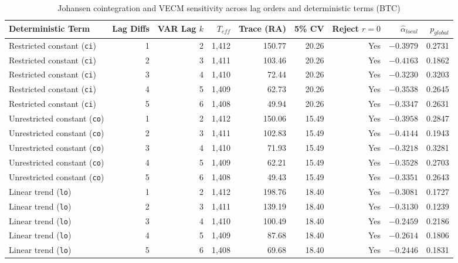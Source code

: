 \begin{table}[htbp]
\centering
\caption{Johansen cointegration and VECM sensitivity across lag orders and deterministic terms (BTC)}
\label{tab:lag_sens}
\fontsize{6.5}{8}\selectfont\setlength{\tabcolsep}{2pt}
\begingroup
\begin{tabular}{@{}>{\raggedright\arraybackslash}p{2.7cm}rrrrrrrr@{}}
\toprule
Deterministic Term & Lag Diffs & VAR Lag $k$ & $T_{eff}$ & Trace (RA) & 5\% CV & Reject $r=0$ & $\hat{\alpha}_{local}$ & $p_{global}$ \\
\midrule
Restricted constant (\texttt{ci}) & 1 & 2 & 1,412 & 150.77 & 20.26 & Yes & $-0.3979$ & 0.2731 \\
Restricted constant (\texttt{ci}) & 2 & 3 & 1,411 & 103.46 & 20.26 & Yes & $-0.4163$ & 0.1862 \\
Restricted constant (\texttt{ci}) & 3 & 4 & 1,410 & 72.44 & 20.26 & Yes & $-0.3230$ & 0.3203 \\
Restricted constant (\texttt{ci}) & 4 & 5 & 1,409 & 62.73 & 20.26 & Yes & $-0.3538$ & 0.2645 \\
Restricted constant (\texttt{ci}) & 5 & 6 & 1,408 & 49.94 & 20.26 & Yes & $-0.3347$ & 0.2631 \\
Unrestricted constant (\texttt{co}) & 1 & 2 & 1,412 & 150.06 & 15.49 & Yes & $-0.3958$ & 0.2847 \\
Unrestricted constant (\texttt{co}) & 2 & 3 & 1,411 & 102.83 & 15.49 & Yes & $-0.4144$ & 0.1943 \\
Unrestricted constant (\texttt{co}) & 3 & 4 & 1,410 & 71.93 & 15.49 & Yes & $-0.3218$ & 0.3281 \\
Unrestricted constant (\texttt{co}) & 4 & 5 & 1,409 & 62.21 & 15.49 & Yes & $-0.3528$ & 0.2703 \\
Unrestricted constant (\texttt{co}) & 5 & 6 & 1,408 & 49.43 & 15.49 & Yes & $-0.3351$ & 0.2643 \\
Linear trend (\texttt{lo}) & 1 & 2 & 1,412 & 198.76 & 18.40 & Yes & $-0.3081$ & 0.1727 \\
Linear trend (\texttt{lo}) & 2 & 3 & 1,411 & 139.19 & 18.40 & Yes & $-0.3130$ & 0.1239 \\
Linear trend (\texttt{lo}) & 3 & 4 & 1,410 & 100.49 & 18.40 & Yes & $-0.2459$ & 0.2186 \\
Linear trend (\texttt{lo}) & 4 & 5 & 1,409 & 87.68 & 18.40 & Yes & $-0.2614$ & 0.1806 \\
Linear trend (\texttt{lo}) & 5 & 6 & 1,408 & 69.68 & 18.40 & Yes & $-0.2446$ & 0.1831 \\
\bottomrule
\end{tabular}\endgroup
\end{table}

